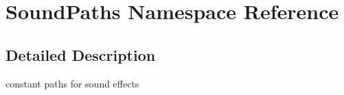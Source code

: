 \hypertarget{namespace_sound_paths}{}\section{Sound\+Paths Namespace Reference}
\label{namespace_sound_paths}


\subsection{Detailed Description}
constant paths for sound effects 